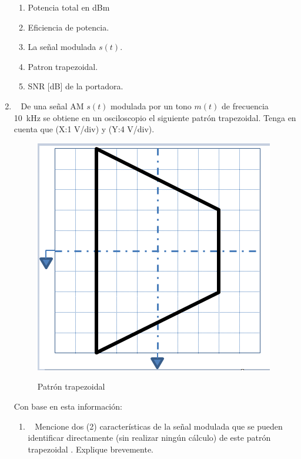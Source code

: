 \begin{enumerate}
\begin{enumerate}
	\item Potencia total en dBm
	
	\item Eficiencia de potencia.
	
	\item La señal modulada $s(t)$.
	
	\item Patron trapezoidal.
	
	\item SNR [dB] de la portadora.
	
\end{enumerate}
\item~ De una señal AM $s(t)$ modulada por un tono $m(t)$ de frecuencia 10~kHz se obtiene en un osciloscopio el siguiente patrón trapezoidal. Tenga en cuenta que (X:1 V/div) y (Y:4 V/div). 


	\begin{figure}[h!]
	\captionsetup{justification = raggedright, singlelinecheck = false}
	\caption{Patrón trapezoidal} 
	\centering
	\includegraphics[scale=0.9]{Imagenes/trap2.png}
	\label{fig:trap2}
\end{figure}




Con base en esta información:
\begin{enumerate}
	\item~ Mencione dos (2) características de la señal modulada que se pueden identificar directamente (sin realizar ningún cálculo) de este patrón trapezoidal . Explique brevemente.
	

\end{enumerate}
\end{enumerate}
